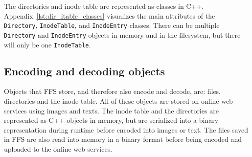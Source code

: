 The directories and inode table are represented as classes in C++. Appendix~\ref{lst:dir_itable_classes} visualizes the main attributes of the \texttt{Directory}, \texttt{InodeTable}, and \texttt{InodeEntry} classes. There can be multiple \texttt{Directory} and \texttt{InodeEntry} objects in memory and in the filesystem, but there will only be one \texttt{InodeTable}.

\subsection{Encoding and decoding objects}
Objects that FFS store, and therefore also encode and decode, are: files, directories and the inode table. All of these objects are stored on online web services using images and texts. The inode table and the directories are represented as C++ objects in memory, but are serialized into a binary representation during runtime before encoded into images or text. The files saved in FFS are also read into memory in a binary format before being encoded and uploaded to the online web services.




